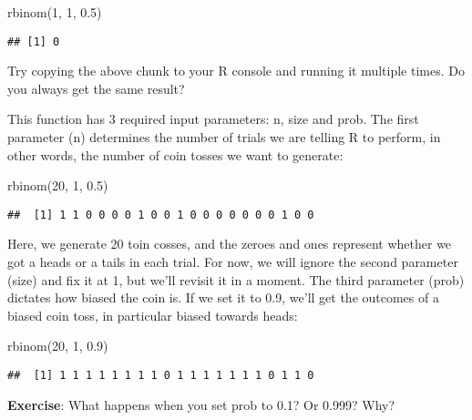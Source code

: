 \documentclass[
]{book}
\newenvironment{Shaded}{\begin{snugshade}}{\end{snugshade}}
\newcommand{\DecValTok}[1]{\textcolor[rgb]{0.00,0.00,0.81}{#1}}
\newcommand{\FloatTok}[1]{\textcolor[rgb]{0.00,0.00,0.81}{#1}}
\newcommand{\FunctionTok}[1]{\textcolor[rgb]{0.00,0.00,0.00}{#1}}
\newcommand{\NormalTok}[1]{#1}
\begin{document}
\begin{Shaded}
\begin{Highlighting}[]
\FunctionTok{rbinom}\NormalTok{(}\DecValTok{1}\NormalTok{, }\DecValTok{1}\NormalTok{, }\FloatTok{0.5}\NormalTok{)}
\end{Highlighting}
\end{Shaded}

\begin{verbatim}
## [1] 0
\end{verbatim}

Try copying the above chunk to your R console and running it multiple times. Do you always get the same result?

This function has 3 required input parameters: n, size and prob. The first parameter (n) determines the number of trials we are telling R to perform, in other words, the number of coin tosses we want to generate:

\begin{Shaded}
\begin{Highlighting}[]
\FunctionTok{rbinom}\NormalTok{(}\DecValTok{20}\NormalTok{, }\DecValTok{1}\NormalTok{, }\FloatTok{0.5}\NormalTok{)}
\end{Highlighting}
\end{Shaded}

\begin{verbatim}
##  [1] 1 1 0 0 0 0 1 0 0 1 0 0 0 0 0 0 0 1 0 0
\end{verbatim}

Here, we generate 20 toin cosses, and the zeroes and ones represent whether we got a heads or a tails in each trial. For now, we will ignore the second parameter (size) and fix it at 1, but we'll revisit it in a moment. The third parameter (prob) dictates how biased the coin is. If we set it to 0.9, we'll get the outcomes of a biased coin toss, in particular biased towards heads:

\begin{Shaded}
\begin{Highlighting}[]
\FunctionTok{rbinom}\NormalTok{(}\DecValTok{20}\NormalTok{, }\DecValTok{1}\NormalTok{, }\FloatTok{0.9}\NormalTok{)}
\end{Highlighting}
\end{Shaded}

\begin{verbatim}
##  [1] 1 1 1 1 1 1 1 1 0 1 1 1 1 1 1 1 0 1 1 0
\end{verbatim}

\textbf{Exercise}: What happens when you set prob to 0.1? Or 0.999? Why?
\end{document}
